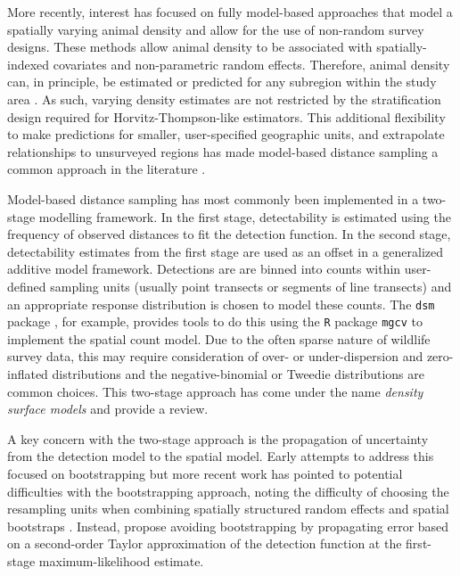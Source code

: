 \documentclass{stylefile16/statsoc}
\begin{document}
More recently, interest has focused on fully model-based approaches that model a spatially varying animal density and allow for the use of non-random survey designs.  These methods allow animal density to be associated with spatially-indexed covariates and non-parametric random effects.  Therefore, animal density can, in principle, be estimated or predicted for any subregion within the study area \citep{johnson_model-based_2010, miller_spatial_2013, buckland_model-based_2016}.  As such, varying density estimates are not restricted by the stratification design required for Horvitz-Thompson-like estimators.  This additional flexibility to make predictions for smaller, user-specified geographic units, and extrapolate relationships to unsurveyed regions has made model-based distance sampling a common approach in the literature \citep{garciabaron_modelling_2019, herr_aerial_2019, breen_new_2017, williams_chilean_2011, stokes_monitoring_2010, williams_modeling_2006}.

Model-based distance sampling has most commonly been implemented in a two-stage modelling framework.  In the first stage, detectability is estimated using the frequency of observed distances to fit the detection function.  In the second stage, detectability estimates from the first stage are used as an offset in a generalized additive model framework.  Detections are are binned into counts within user-defined sampling units (usually point transects or segments of line transects) and an appropriate response distribution is chosen to model these counts.  The \texttt{dsm} package \citep{miller_spatial_2013}, for example, provides tools to do this using the \texttt{R} package \texttt{mgcv} \citep{wood_gam_2017} to implement the spatial count model.   Due to the often sparse nature of wildlife survey data, this may require consideration of over- or under-dispersion and zero-inflated distributions and the negative-binomial or Tweedie distributions are common choices.  This two-stage approach has come under the name \textit{density surface models} and \cite{miller_spatial_2013} provide a review.

A key concern with the two-stage approach is the propagation of uncertainty from the detection model to the spatial model.  Early attempts to address this focused on bootstrapping \citep{lahiri_resampling_2003, hedley_spatial_2004} but more recent work has pointed to potential difficulties with the bootstrapping approach, noting the difficulty of choosing the resampling units when combining spatially structured random effects and spatial bootstraps \citep{bravington_VariancePropagationDensity_2021, williams_chilean_2011}. Instead, \cite{bravington_VariancePropagationDensity_2021} propose avoiding bootstrapping by propagating error based on a second-order Taylor approximation of the detection function at the first-stage maximum-likelihood estimate.
\end{document}

